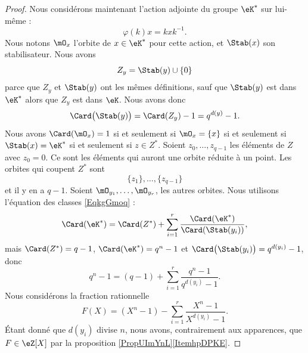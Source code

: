 \begin{proof}
    Nous considérons maintenant l'action adjointe du groupe \( \eK^*\) sur lui-même :
    \begin{equation}
        \varphi(k)x=kxk^{-1}.
    \end{equation}
    Nous notons \( \mO_x\) l'orbite de \( x\in \eK^*\) pour cette action, et \( \Stab(x)\) son stabilisateur. Nous avons
    \begin{equation}
        Z_y=\Stab(y)\cup\{ 0 \}
    \end{equation}
    parce que \( Z_y\) et \( \Stab(y)\) ont les mêmes définitions, sauf que \( \Stab(y)\) est dans \( \eK^*\) alors que \( Z_y\) est dans \( \eK\). Nous avons donc
    \begin{equation}
        \Card\big( \Stab(y) \big)=\Card(Z_y)-1=q^{d(y)}-1.
    \end{equation}
    Nous avons \( \Card(\mO_x)=1\) si et seulement si \( \mO_x=\{ x \}\) si et seulement si \( \Stab(x)=\eK^*\) si et seulement si \( z\in Z^*\). Soient \( z_0,\ldots, z_{q-1}\) les éléments de \( Z\) avec \( z_0=0\). Ce sont les éléments qui auront une orbite réduite à un point. Les orbites qui coupent \( Z^*\) sont
    \begin{equation}
        \{ z_1 \},\ldots, \{ z_{q-1} \}
    \end{equation}
    et il y en a \( q-1\). Soient \( \mO_{y_1},\ldots, \mO_{y_r}\), les autres orbites. Nous utilisons l'équation des classes \eqref{EqkgGmoq} :
    \begin{equation}
        \Card(\eK^*)=\Card(Z^*)+\sum_{i=1}^{r}\frac{ \Card(\eK^*) }{ \Card(\Stab(y_i)) },
    \end{equation}
    mais \( \Card(Z^*)=q-1\), \( \Card(\eK^*)=q^n-1\) et \( \Card\big( \Stab(y_i) \big)=q^{d(y_i)}-1\), donc
    \begin{equation}        \label{EqBPBDzE}
        q^n-1=(q-1)+\sum_{i=1}^{r}\frac{ q^n-1 }{ q^{d(y_i)}-1 }.
    \end{equation}
    Nous considérons la fraction rationnelle
    \begin{equation}        \label{EqATGciu}
        F(X)=(X^n-1)-\sum_{i=1}^{r}\frac{ X^n-1 }{ X^{d(y_i)}-1 }.
    \end{equation}
    Étant donné que \( d(y_i)\) divise \( n\), nous avons, contrairement aux apparences, que \( F\in \eZ[X]\) par la proposition \ref{PropUImYnL}\ref{ItemhpDPKE}.


\end{proof}
